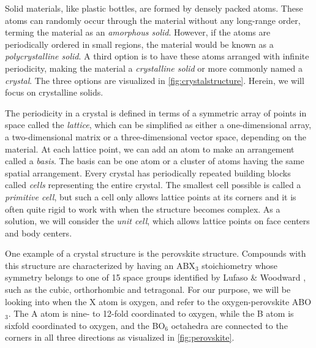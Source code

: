 

Solid materials, like plastic bottles, are formed by densely packed atoms. These atoms can randomly occur through the material without any long-range order, terming the material as an \textit{amorphous solid}. However, if the atoms are periodically ordered in small regions, the material would be known as a \textit{polycrystalline solid}. %
A third option is to have these atoms arranged with infinite periodicity, making the material a \textit{crystalline solid} or more commonly named a \textit{crystal}. The three options are visualized in \autoref{fig:crystalstructure}. Herein, we will focus on crystalline solids.

The periodicity in a crystal is defined in terms of a symmetric array of points in space called the \textit{lattice}, which can be simplified as either a one-dimensional array, a two-dimensional matrix or a three-dimensional vector space, depending on the material. At each lattice point, we can add an atom to make an arrangement called a \textit{basis}. The basis can be one atom or a cluster of atoms having the same spatial arrangement. Every crystal has periodically repeated building blocks called \textit{cells} representing the entire crystal. The smallest cell possible is called a \textit{primitive cell}, but such a cell only allows lattice points at its corners and it is often quite rigid to work with when the structure becomes complex. As a solution, we will consider the \textit{unit cell}, which allows lattice points on face centers and body centers.

One example of a crystal structure is the perovskite structure. Compounds with this structure are characterized by having an ABX$_3$ stoichiometry whose symmetry belongs to one of 15 space groups identified by Lufaso \& Woodward \cite{Lufaso2001}, such as the cubic, orthorhombic and tetragonal. For our purpose, we will be looking into when the X atom is oxygen, and refer to the oxygen-perovskite ABO$_3$. The A atom is nine- to 12-fold coordinated to oxygen, while the B atom is sixfold coordinated to oxygen, and the BO$_6$ octahedra are connected to the corners in all three directions as visualized in \autoref{fig:perovskite}.

